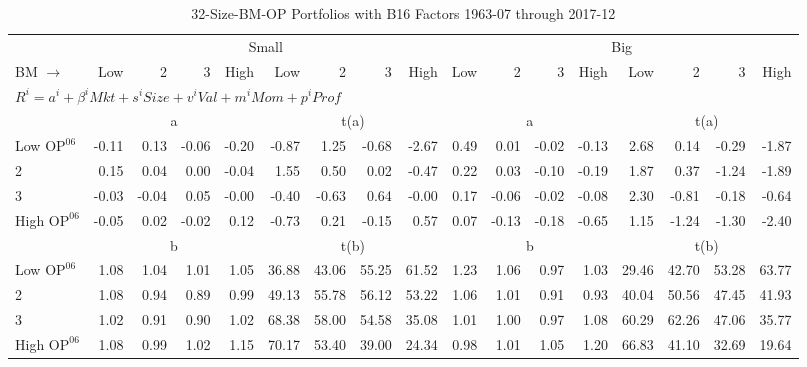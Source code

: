 
\begin{table}[!ht]
\footnotesize
\centering
\caption{32-Size-BM-OP Portfolios with B16 Factors 1963-07 through 2017-12}
\begin{tabular}{lrrrrrrrrrrrrrrrr}
  \toprule
     & \multicolumn{8}{c}{Small} & \multicolumn{8}{c}{Big}  \\
     \cmidrule(r){2-9} \cmidrule(r){10-17}
    BM $\rightarrow$ & Low & 2 & 3 & High & Low & 2 & 3 & High & Low & 2 & 3 & High & Low & 2 & 3 & High  \\ 
  \midrule
  \multicolumn{17}{l}{$R^i=a^i+\beta^iMkt+s^iSize+v^iVal+m^iMom+p^iProf$}  \\
  
     & \multicolumn{4}{c}{a} & \multicolumn{4}{c}{t(a)}  & \multicolumn{4}{c}{a} & \multicolumn{4}{c}{t(a)}   \\
     \cmidrule(r){2-5} \cmidrule(r){6-9}  \cmidrule(r){10-13} \cmidrule(r){14-17} 
    Low $\text{OP}^{06}$  & -0.11  & 0.13  & -0.06  & -0.20  & -0.87  & 1.25  & -0.68  & -2.67  & 0.49  & 0.01  & -0.02  & -0.13  & 2.68  & 0.14  & -0.29  & -1.87   \\
    2  & 0.15  & 0.04  & 0.00  & -0.04  & 1.55  & 0.50  & 0.02  & -0.47  & 0.22  & 0.03  & -0.10  & -0.19  & 1.87  & 0.37  & -1.24  & -1.89   \\
    3  & -0.03  & -0.04  & 0.05  & -0.00  & -0.40  & -0.63  & 0.64  & -0.00  & 0.17  & -0.06  & -0.02  & -0.08  & 2.30  & -0.81  & -0.18  & -0.64   \\
    High $\text{OP}^{06}$  & -0.05  & 0.02  & -0.02  & 0.12  & -0.73  & 0.21  & -0.15  & 0.57  & 0.07  & -0.13  & -0.18  & -0.65  & 1.15  & -1.24  & -1.30  & -2.40   \\
    
  
     & \multicolumn{4}{c}{b} & \multicolumn{4}{c}{t(b)}  & \multicolumn{4}{c}{b} & \multicolumn{4}{c}{t(b)}   \\
     \cmidrule(r){2-5} \cmidrule(r){6-9}  \cmidrule(r){10-13} \cmidrule(r){14-17} 
    Low $\text{OP}^{06}$  & 1.08  & 1.04  & 1.01  & 1.05  & 36.88  & 43.06  & 55.25  & 61.52  & 1.23  & 1.06  & 0.97  & 1.03  & 29.46  & 42.70  & 53.28  & 63.77   \\
    2  & 1.08  & 0.94  & 0.89  & 0.99  & 49.13  & 55.78  & 56.12  & 53.22  & 1.06  & 1.01  & 0.91  & 0.93  & 40.04  & 50.56  & 47.45  & 41.93   \\
    3  & 1.02  & 0.91  & 0.90  & 1.02  & 68.38  & 58.00  & 54.58  & 35.08  & 1.01  & 1.00  & 0.97  & 1.08  & 60.29  & 62.26  & 47.06  & 35.77   \\
    High $\text{OP}^{06}$  & 1.08  & 0.99  & 1.02  & 1.15  & 70.17  & 53.40  & 39.00  & 24.34  & 0.98  & 1.01  & 1.05  & 1.20  & 66.83  & 41.10  & 32.69  & 19.64   \\
    

\end{tabular}
\end{table}
